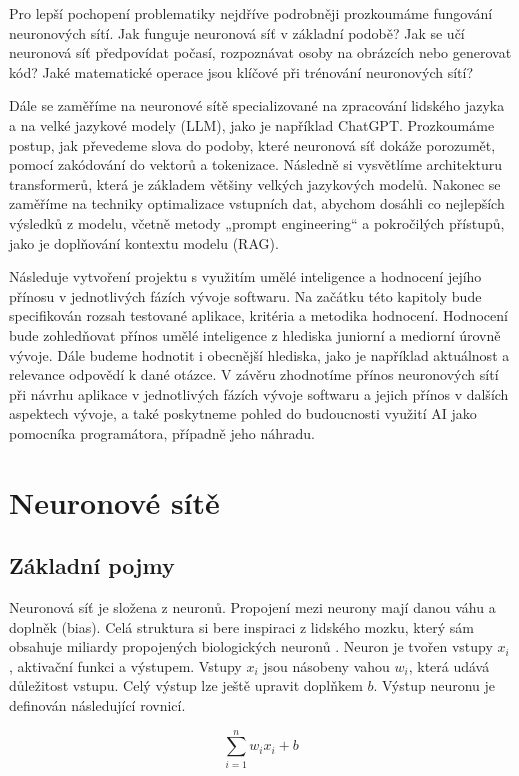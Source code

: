 \documentclass[FM,DP]{tulthesis}
\begin{document}
		Pro lepší pochopení problematiky nejdříve podrobněji prozkoumáme fungování neuronových sítí. Jak funguje neuronová síť v základní podobě? Jak se učí neuronová síť předpovídat počasí, rozpoznávat osoby na obrázcích nebo generovat kód? Jaké matematické operace jsou klíčové při trénování neuronových sítí?
		
		Dále se zaměříme na neuronové sítě specializované na zpracování lidského jazyka a na velké jazykové modely (LLM), jako je například ChatGPT. Prozkoumáme postup, jak převedeme slova do podoby, které neuronová síť dokáže porozumět, pomocí zakódování do vektorů a tokenizace. Následně si vysvětlíme architekturu transformerů, která je základem většiny velkých jazykových modelů. Nakonec se zaměříme na techniky optimalizace vstupních dat, abychom dosáhli co nejlepších výsledků z modelu, včetně metody „prompt engineering“ a pokročilých přístupů, jako je doplňování kontextu modelu (RAG).
		
		Následuje vytvoření projektu s využitím umělé inteligence a hodnocení jejího přínosu v jednotlivých fázích vývoje softwaru. Na začátku této kapitoly bude specifikován rozsah testované aplikace, kritéria a metodika hodnocení. Hodnocení bude zohledňovat přínos umělé inteligence z hlediska juniorní a mediorní úrovně vývoje. Dále budeme hodnotit i obecnější hlediska, jako je například aktuálnost a relevance odpovědí k dané otázce. V závěru zhodnotíme přínos neuronových sítí při návrhu aplikace v jednotlivých fázích vývoje softwaru a jejich přínos v dalších aspektech vývoje, a také poskytneme pohled do budoucnosti využití AI jako pomocníka programátora, případně jeho náhradu.
		
		\chapter{Neuronové sítě} \label{nns}
		\section{Základní pojmy}
		Neuronová síť je složena z neuronů. Propojení mezi neurony mají danou váhu a doplněk (bias). Celá struktura si bere inspiraci z lidského mozku, který sám obsahuje miliardy propojených biologických neuronů \cite{general}. Neuron je tvořen vstupy $x_i$, aktivační funkci a výstupem. Vstupy $x_i$ jsou násobeny vahou $w_i$, která udává důležitost vstupu. Celý výstup lze ještě upravit doplňkem $b$. Výstup neuronu je definován následující rovnicí.
		

			\begin{equation}
				\sum_{i=1}^{n} w_i x_i + b
			\end{equation}
\end{document}
